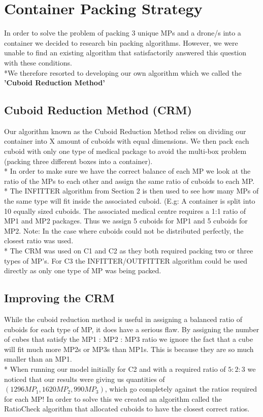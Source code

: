 \documentclass[a4paper,12pt]{article}
\begin{document}
\section{Container Packing Strategy}
In order to solve the problem of packing 3 unique MPs and a drone/s into a container we decided to research bin packing algorithms.
However, we were unable to find an existing algorithm that satisfactorily answered this question with these conditions.
\\*We therefore resorted to developing our own algorithm which we called the \bf{'Cuboid Reduction Method'} 

\subsection{Cuboid Reduction Method (CRM)}
Our algorithm known as the Cuboid Reduction Method relies on dividing our container into X amount of cuboids with equal dimensions. We then pack each cuboid with only one
type of medical package to avoid the multi-box problem (packing three different boxes into a container).\\* In order to make sure we have the correct balance of each MP we
look at the ratio of the MPs to each other and assign the same ratio of cuboids to each MP.\\*
The INFITTER algorithm from Section 2 is then used to see how many MPs of the same type will fit inside the associated cuboid.
(E.g: A container is split into 10 equally sized cuboids. The associated medical centre requires a 1:1 ratio of MP1 and MP2 packages. Thus we assign 5 cuboids for MP1 and 5 cuboids for MP2.
Note: In the case where cuboids could not be distributed perfectly, the closest ratio was used.
\\*
The CRM was used on C1 and C2 as they both required packing two or three types of MP's. For C3 the INFITTER/OUTFITTER algorithm could be used directly as only one type of MP was being packed.

\subsection{Improving the CRM}
While the cuboid reduction method is useful in assigning a balanced ratio of cuboids for each type of MP, it does have a serious flaw. By assigning the number of cubes that satisfy the MP1 : MP2 : MP3
ratio we ignore the fact that a cube will fit much more MP2s or MP3s than MP1s. This is because they are so much smaller than an MP1.\\*
When running our model initially for C2 and with a required ratio of $5:2:3$  we noticed that our results were giving us quantities of $(1296MP_1, 1620MP_2,990MP_3)$, which go completely against the ratios required for each MP!
In order to solve this we created an algorithm called the RatioCheck algorithm that allocated cuboids to have the closest correct ratios.
\end{document}
